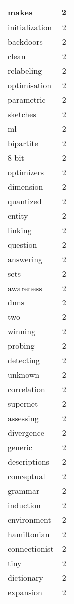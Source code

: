 \begin{table}[h]
\begin{tabular}{|l|r|}
\hline
makes & 2 \\
\hline
initialization & 2 \\
\hline
backdoors & 2 \\
\hline
clean & 2 \\
\hline
relabeling & 2 \\
\hline
optimisation & 2 \\
\hline
parametric & 2 \\
\hline
sketches & 2 \\
\hline
ml & 2 \\
\hline
bipartite & 2 \\
\hline
8-bit & 2 \\
\hline
optimizers & 2 \\
\hline
dimension & 2 \\
\hline
quantized & 2 \\
\hline
entity & 2 \\
\hline
linking & 2 \\
\hline
question & 2 \\
\hline
answering & 2 \\
\hline
sets & 2 \\
\hline
awareness & 2 \\
\hline
dnns & 2 \\
\hline
two & 2 \\
\hline
winning & 2 \\
\hline
probing & 2 \\
\hline
detecting & 2 \\
\hline
unknown & 2 \\
\hline
correlation & 2 \\
\hline
supernet & 2 \\
\hline
assessing & 2 \\
\hline
divergence & 2 \\
\hline
generic & 2 \\
\hline
descriptions & 2 \\
\hline
conceptual & 2 \\
\hline
grammar & 2 \\
\hline
induction & 2 \\
\hline
environment & 2 \\
\hline
hamiltonian & 2 \\
\hline
connectionist & 2 \\
\hline
tiny & 2 \\
\hline
dictionary & 2 \\
\hline
expansion & 2 \\
\hline

\end{tabular}
\end{table}
